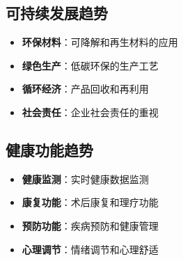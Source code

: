 \documentclass[12pt,UTF8]{ctexbook}
\begin{document}
\subsection{可持续发展趋势}
\begin{itemize}[leftmargin=2cm]
	\item \textbf{环保材料}：可降解和再生材料的应用
	\item \textbf{绿色生产}：低碳环保的生产工艺
	\item \textbf{循环经济}：产品回收和再利用
	\item \textbf{社会责任}：企业社会责任的重视
\end{itemize}

\subsection{健康功能趋势}
\begin{itemize}[leftmargin=2cm]
	\item \textbf{健康监测}：实时健康数据监测
	\item \textbf{康复功能}：术后康复和理疗功能
	\item \textbf{预防功能}：疾病预防和健康管理
	\item \textbf{心理调节}：情绪调节和心理舒适
\end{itemize}

\backmatter
\end{document}
